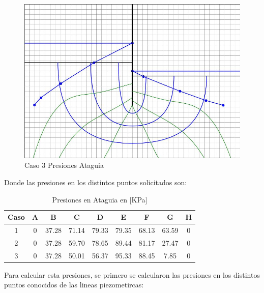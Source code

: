 \documentclass{article}
\begin{document}
\begin{figure}[H]
\begin{minipage}{0.32\textwidth}
      \includegraphics[width=\textwidth]{FOTOS/caso_3_presion_ataquia_total.jpg}
      \caption{Caso 3 Presiones Ataguia}
  \end{minipage}
\end{figure}

Donde las presiones en los distintos puntos solicitados son:

\begin{table}[H]
  \centering
  \begin{tabular}{|c|c|c|c|c|c|c|c|c|}
    \hline
    Caso & A & B & C & D & E & F & G & H \\
    \hline
    1 & 0 & 37.28 & 71.14 & 79.33 & 79.35 & 68.13 & 63.59 & 0 \\ \hline
    2 & 0 & 37.28 & 59.70 & 78.65 & 89.44 & 81.17 & 27.47 & 0 \\ \hline
    3 & 0 & 37.28 & 50.01 & 56.37 & 95.33 & 88.45 & 7.85 & 0 \\
    \hline
  \end{tabular}
  \caption{Presiones en Ataguia en [KPa]}
\end{table}


Para calcular esta presiones, se primero se calcularon las presiones en los distintos puntos conocidos de las lineas piezometircas:
\end{document}
